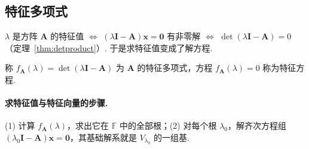 \documentclass[lang=cn,10.5pt,scheme=chinese,toc=twocol,section,chinesefont=nofont,
twoside,citestyle=gb7714-2015,bibstyle=gb7714-2015]{elegantbook}
\DeclareRobustCommand{\textbf}[1]{{\lnsemiboldlatin\lnsemiboldcjk #1}}
\newcommand{\vv}[1]{\boldsymbol{#1}}
\newcommand{\zero}{\boldsymbol{0}}          %
\numberwithin{equation}{section}   %
\begin{document}
\subsection{特征多项式}

$\lambda$ 是方阵 $\vv A$ 的特征值 $\iff$ $(\lambda\vv I-\vv A)\vv x=\zero$ 有非零解 $\iff$ $\det(\lambda\vv I-\vv A)=0$（定理~\ref{thm:detproduct}）. 于是求特征值变成了解方程.

\begin{definition}
  称 $f_{\vv A}(\lambda)=\det(\lambda\vv I-\vv A)$ 为 $\vv A$ 的\textbf{特征多项式}，方程 $f_{\vv A}(\lambda)=0$ 称为\textbf{特征方程}.
\end{definition}

\paragraph*{求特征值与特征向量的步骤.} (1) 计算 $f_{\vv A}(\lambda)$，求出它在 $\mathbb{F}$ 中的全部根；(2) 对每个根 $\lambda_0$，解齐次方程组 $(\lambda_0\vv I-\vv A)\vv x=\zero$，其基础解系就是 $V_{\lambda_0}$ 的一组基.
\end{document}
